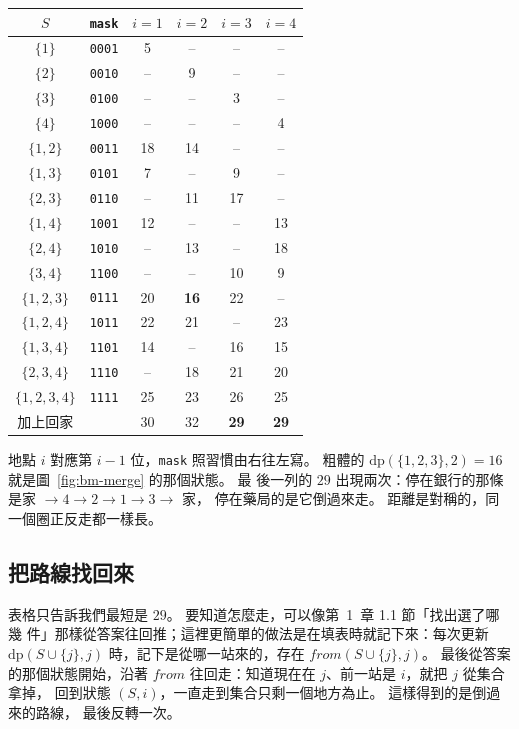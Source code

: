 \begin{center}
\begin{tabular}{cc|cccc}
\toprule
$S$ & \texttt{mask} & $i = 1$ & $i = 2$ & $i = 3$ & $i = 4$ \\
\midrule
$\{1\}$ & \texttt{0001} & 5 & -- & -- & -- \\
$\{2\}$ & \texttt{0010} & -- & 9 & -- & -- \\
$\{3\}$ & \texttt{0100} & -- & -- & 3 & -- \\
$\{4\}$ & \texttt{1000} & -- & -- & -- & 4 \\
\midrule
$\{1, 2\}$ & \texttt{0011} & 18 & 14 & -- & -- \\
$\{1, 3\}$ & \texttt{0101} & 7 & -- & 9 & -- \\
$\{2, 3\}$ & \texttt{0110} & -- & 11 & 17 & -- \\
$\{1, 4\}$ & \texttt{1001} & 12 & -- & -- & 13 \\
$\{2, 4\}$ & \texttt{1010} & -- & 13 & -- & 18 \\
$\{3, 4\}$ & \texttt{1100} & -- & -- & 10 & 9 \\
\midrule
$\{1, 2, 3\}$ & \texttt{0111} & 20 & \textbf{16} & 22 & -- \\
$\{1, 2, 4\}$ & \texttt{1011} & 22 & 21 & -- & 23 \\
$\{1, 3, 4\}$ & \texttt{1101} & 14 & -- & 16 & 15 \\
$\{2, 3, 4\}$ & \texttt{1110} & -- & 18 & 21 & 20 \\
\midrule
$\{1, 2, 3, 4\}$ & \texttt{1111} & 25 & 23 & 26 & 25 \\
加上回家 & & 30 & 32 & \textbf{29} & \textbf{29} \\
\bottomrule
\end{tabular}
\end{center}

地點 $i$ 對應第 $i - 1$ 位，\texttt{mask} 照習慣由右往左寫。 粗體的
$\mathrm{dp}(\{1, 2, 3\}, 2) = 16$ 就是圖~\ref{fig:bm-merge} 的那個狀態。 最
後一列的 $29$ 出現兩次：停在銀行的那條是家 $\to 4 \to 2 \to 1 \to 3 \to$ 家，
停在藥局的是它倒過來走。 距離是對稱的，同一個圈正反走都一樣長。

\subsection{把路線找回來}
\label{sec:bm-route}

表格只告訴我們最短是 $29$。 要知道怎麼走，可以像第~1~章 1.1 節「找出選了哪幾
件」那樣從答案往回推；這裡更簡單的做法是在填表時就記下來：每次更新 $\mathrm{dp}(S \cup \{j\}, j)$ 時，記下是從哪一站來的，存在
$\mathit{from}(S \cup \{j\}, j)$。 最後從答案的那個狀態開始，沿著
$\mathit{from}$ 往回走：知道現在在 $j$、前一站是 $i$，就把 $j$ 從集合拿掉，
回到狀態 $(S, i)$，一直走到集合只剩一個地方為止。 這樣得到的是倒過來的路線，
最後反轉一次。

